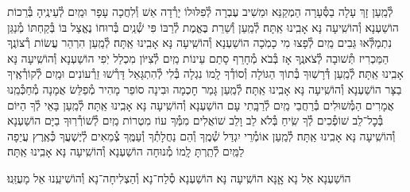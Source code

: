 \documentclass[twoside, openany, parskip=half, 11pt]{book}
\begin{document}
\begin{small}
לְ֯מַֽעַן זָךְ עָלָה בַסְּ֯עָרָה הַמְקַנֵּא וּמֵשִׁיב עֶבְרָה
לְ֯פִלּוּלוֹ יָרְ֯דָה אֵשׁ וְ֯לִחֲכָה עָפָר וּמַֽיִם לְ֯עֵינֶֽיהָ בְּ֯רֵכוֹת הוֹשַׁעְנָא וְ֯הוֹשִֽׁיעָה נָּא אָבִֽינוּ אַֽתָּה׃
לְ֯מַֽעַן וְ֯שֵׁרֵת בֶּאֱמֶת לְ֯רַבּוֹ פִּי שְׁ֯נַֽיִם בְּ֯רוּחוֹ נֶאֱצַל בּוֹ
בְּ֯קַחְתּוֹ מְ֯נַגֵּן נִתְמַלְּ֯אוּ גֵּבִים מַֽיִם לְ֯פָצוּ מִי כָמֹֽכָה הוֹשַׁעְנָא וְ֯הוֹשִֽׁיעָה נָּא אָבִֽינוּ אַֽתָּה׃
לְ֯מַֽעַן הִרְהֵר עֲשׂוֹת רְ֯צוֹנֶֽךָ הַמַּכְרִיז תְּ֯שׁוּבָה לְ֯צֹאנֶֽךָ
אָז בְּ֯בֹא מְ֯חָרֵף סָתַם עֵינוֹת מַֽיִם לְ֯צִיּוֹן מִכְלַל יֹֽפִי הוֹשַׁעְנָא וְ֯הוֹשִֽׁיעָה נָּא אָבִֽינוּ אַֽתָּה׃
לְ֯מַֽעַן דְּ֯רָשֽׁוּךָ בְּ֯תוֹךְ הַגּוֹלָה וְ֯סוֹדְ֯ךָ לָֽמוֹ נִגְלָה
בְּ֯לִי לְ֯הִתְגָּאֵל דָּרְ֯שׁוּ זֵרְ֯עוֹנִים וּמַֽיִם לְ֯קוֹרְ֯אֶֽיךָ בַצָּר הוֹשַׁעְנָא וְ֯הוֹשִֽׁיעָה נָּא אָבִֽינוּ אַֽתָּה׃
לְ֯מַֽעַן גָּמַר חׇכְמָה וּבִינָה סוֹפֵר מָהִיר מְ֯פַלֵּשׂ אֲמָנָה
מְ֯חַכְּ֯מֵֽנוּ אֲמָרִים הַמְּ֯שׁוּלִים בְּ֯רַחֲבֵי מַֽיִם לְ֯רַבָּֽתִי עָם הוֹשַׁעְנָא וְ֯הוֹשִֽׁיעָה נָּא אָבִֽינוּ אַֽתָּה׃
לְ֯מַֽעַן בָּאֵי לְ֯ךָ הַיּוֹם בְּ֯כׇל־לֵב שׁוֹפְ֯כִים לְ֯ךָ שִֽׂיחַ בְּ֯לֹא לֵב וָלֵב
שׁוֹאֲלִים מִמְּ֯ךָ עוֹז מִטְרוֹת מַֽיִם לְ֯שׁוֹרְ֯רֽוּךָ בַיָּם הוֹשַׁעְנָא וְ֯הוֹשִֽׁיעָה נָּא אָבִֽינוּ אַֽתָּה׃
לְ֯מַֽעַן אוֹמְ֯רֵי יִגְדַּל שְׁ֯מֶֽךָ וְ֯הֵם נַחֲלָתְ֯ךָ וְ֯עַמֶּֽךָ
צְ֯מֵאִים לְ֯יֶשְׁעֲךָ כְּ֯אֶֽרֶץ עֲיֵפָה לַמַּֽיִם לְ֯תַֽרְתָּ לָֽמוֹ מְ֯נוּחָה הוֹשַׁעְנָא וְ֯הוֹשִֽׁיעָה נָּא אָבִֽינוּ אַֽתָּה׃

\end{small}

\begin{large}
\shatzvkahal
הוֹשַׁעְנָא אֵל נָא אׇׇנָּא הוֹשִֽׁיעָה נָּא׃
הוֹשַׁעְנָא סְ֯לַח־נָא וְ֯הַצְלִיחָה־נָא וְ֯הוֹשִׁיעֵֽנוּ אֵל מָעֻזֵּֽנוּ׃

\end{large}
\end{document}
